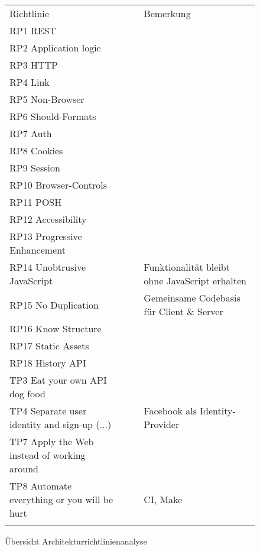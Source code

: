 \begin{figure}[H]
	\begin{table}[H]
		\tablestyle
		\tablealtcolored
		\begin{tabularx}{\textwidth}{l c c X}
			\tableheadcolor
				\tablehead Richtlinie &
				\tablehead\rotatebox{90}{Demonstriert\hspace{3mm}} &
				\tablehead\rotatebox{90}{Resultat} &
				\tablehead Bemerkung
				\tabularnewline
			\tablebody
				RP1	REST & \faOk & \faSmile & \tabularnewline
				RP2 Application logic & & & \tabularnewline
				RP3 HTTP & \faOk & \faSmile & \tabularnewline
				RP4 Link & \faOk & \faSmile & \tabularnewline
				RP5 Non-Browser & \faOk & \faSmile & \tabularnewline
				RP6 Should-Formats & \faOk & \faSmile & \tabularnewline
				RP7 Auth & & & \tabularnewline
				RP8 Cookies & & & \tabularnewline
				RP9 Session & & & \tabularnewline
				RP10 Browser-Controls & \faOk & \faSmile & \tabularnewline
				RP11 POSH & & & \tabularnewline
				RP12 Accessibility & & & \tabularnewline
				RP13 Progressive Enhancement & & & \tabularnewline
				RP14 Unobtrusive JavaScript & \faOk & \faSmile & Funktionalität bleibt ohne JavaScript erhalten\tabularnewline
				RP15 No Duplication & & & Gemeinsame Codebasis für Client \& Server\tabularnewline
				RP16 Know Structure & & & \tabularnewline
				RP17 Static Assets & \faOk & \faSmile & \tabularnewline
				RP18 History API & \faOk & \faSmile & \tabularnewline
				TP3 Eat your own API dog food & & & \tabularnewline
				TP4 Separate user identity and sign-up (...) & \faOk & \faSmile & Facebook als Identity-Provider\tabularnewline
				TP7 Apply the Web instead of working around & \faOk & \faMeh & \tabularnewline
				TP8 Automate everything or you will be hurt & \faOk & \faSmile & \gls{CI}, Make\tabularnewline
			\tableend
		\end{tabularx}
	\end{table}
	\caption{Übersicht Architekturrichtlinienanalyse}
	\label{tab:overview-principle-demonstration}
\end{figure}



\newpage

